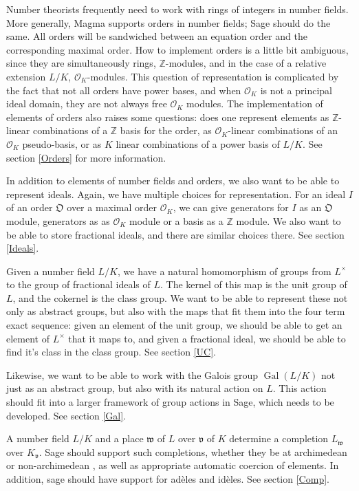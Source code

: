 \documentclass[12pt]{article}
\providecommand{\Gal}{\operatorname{Gal}}
\begin{document}
Number theorists frequently need to work with rings of integers in number fields.  More generally, Magma supports orders in number fields; Sage should do the same.  All orders will be sandwiched between an equation order and the corresponding maximal order.  How to implement orders is a little bit ambiguous, since they are simultaneously rings, $\mathbb{Z}$-modules, and in the case of a relative extension $L/K$, $\mathcal{O}_K$-modules.  This question of representation is complicated by the fact that not all orders have power bases, and when $\mathcal{O}_K$ is not a principal ideal domain, they are not always free $\mathcal{O}_K$ modules.  The implementation of elements of orders also raises some questions: does one represent elements as $\mathbb{Z}$-linear combinations of a $\mathbb{Z}$ basis for the order, as $\mathcal{O}_K$-linear combinations of an $\mathcal{O}_K$ pseudo-basis, or as $K$ linear combinations of a power basis of $L/K$.  See section \ref{Orders} for more information.

In addition to elements of number fields and orders, we also want to be able to represent ideals.  Again, we have multiple choices for representation.  For an ideal $I$ of an order $\mathfrak{O}$ over a maximal order $\mathcal{O}_K$, we can give generators for $I$ as an $\mathfrak{O}$ module, generators as as $\mathcal{O}_K$ module or a basis as a $\mathbb{Z}$ module.  We also want to be able to store fractional ideals, and there are similar choices there.  See section \ref{Ideals}.

Given a number field $L/K$, we have a natural homomorphism of groups from $L^{\times}$ to the group of fractional ideals of $L$.  The kernel of this map is the unit group of $L$, and the cokernel is the class group.  We want to be able to represent these not only as abstract groups, but also with the maps that fit them into the four term exact sequence: given an element of the unit group, we should be able to get an element of $L^{\times}$ that it maps to, and given a fractional ideal, we should be able to find it's class in the class group.  See section \ref{UC}.

Likewise, we want to be able to work with the Galois group $\Gal(L/K)$ not just as an abstract group, but also with its natural action on $L$.  This action should fit into a larger framework of group actions in Sage, which needs to be developed.  See section \ref{Gal}.

A number field $L/K$ and a place $\mathfrak{w}$ of $L$ over $\mathfrak{v}$ of $K$ determine a completion $L_{\mathfrak{w}}$ over $K_{\mathfrak{v}}$.  Sage should support such completions, whether they be at archimedean or non-archimedean , as well as appropriate automatic coercion of elements.  In addition, sage should have support for ad\`{e}les and id\`{e}les.  See section \ref{Comp}.
\end{document}
